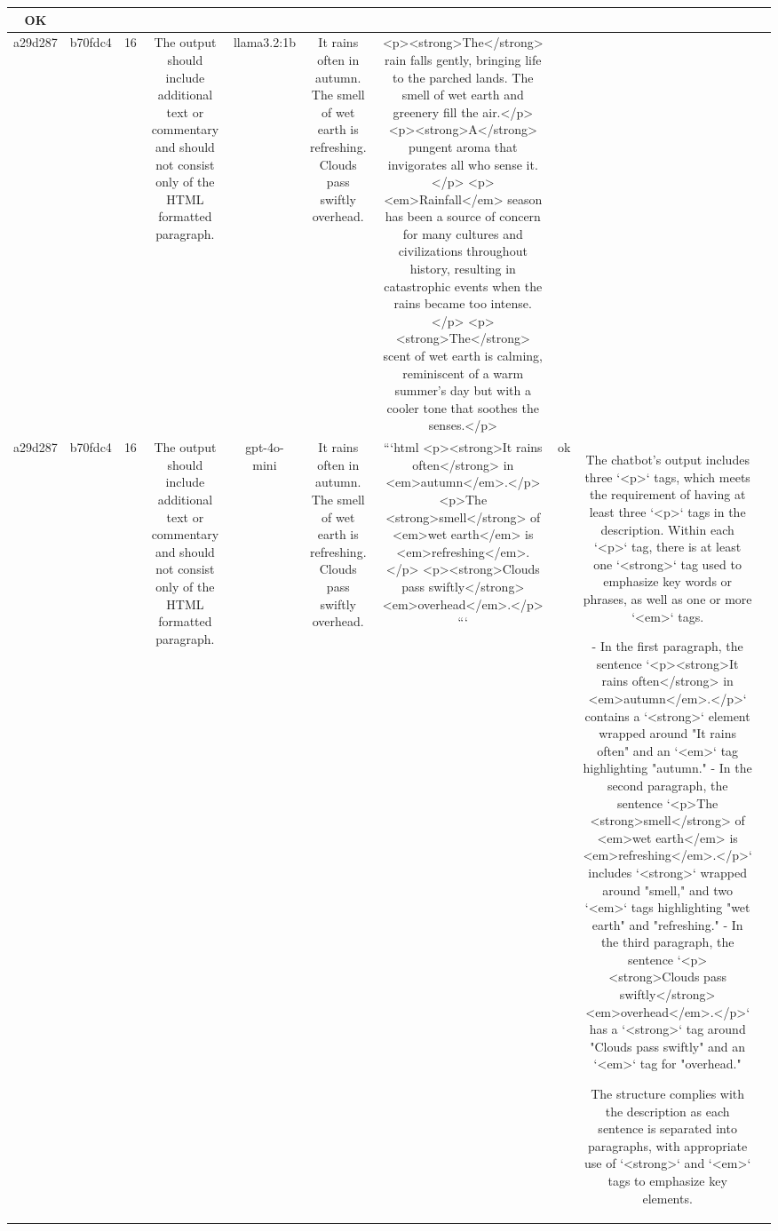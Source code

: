 \begin{table}[h!]
\begin{tabular}{|c|c|c|c|c|c|c|c|c|c|}
OK & \\
\hline
a29d287 & b70fdc4 & 16 & The output should include additional text or commentary and should not consist only of the HTML formatted paragraph. & llama3.2:1b & It rains often in autumn. The smell of wet earth is refreshing. Clouds pass swiftly overhead. & <p><strong>The</strong> rain falls gently, bringing life to the parched lands. The smell of wet earth and greenery fill the air.</p>
<p><strong>A</strong> pungent aroma that invigorates all who sense it.</p>
<p><em>Rainfall</em> season has been a source of concern for many cultures and civilizations throughout history, resulting in catastrophic events when the rains became too intense.</p>
<p><strong>The</strong> scent of wet earth is calming, reminiscent of a warm summer's day but with a cooler tone that soothes the senses.</p> &  &  & \\
\hline
a29d287 & b70fdc4 & 16 & The output should include additional text or commentary and should not consist only of the HTML formatted paragraph. & gpt-4o-mini & It rains often in autumn. The smell of wet earth is refreshing. Clouds pass swiftly overhead. & ```html
<p><strong>It rains often</strong> in <em>autumn</em>.</p>
<p>The <strong>smell</strong> of <em>wet earth</em> is <em>refreshing</em>.</p>
<p><strong>Clouds pass swiftly</strong> <em>overhead</em>.</p>
``` & ok & The chatbot's output includes three `<p>` tags, which meets the requirement of having at least three `<p>` tags in the description. Within each `<p>` tag, there is at least one `<strong>` tag used to emphasize key words or phrases, as well as one or more `<em>` tags. 

- In the first paragraph, the sentence `<p><strong>It rains often</strong> in <em>autumn</em>.</p>` contains a `<strong>` element wrapped around "It rains often" and an `<em>` tag highlighting "autumn."
- In the second paragraph, the sentence `<p>The <strong>smell</strong> of <em>wet earth</em> is <em>refreshing</em>.</p>` includes `<strong>` wrapped around "smell," and two `<em>` tags highlighting "wet earth" and "refreshing."
- In the third paragraph, the sentence `<p><strong>Clouds pass swiftly</strong> <em>overhead</em>.</p>` has a `<strong>` tag around "Clouds pass swiftly" and an `<em>` tag for "overhead."

The structure complies with the description as each sentence is separated into paragraphs, with appropriate use of `<strong>` and `<em>` tags to emphasize key elements.


\end{tabular}
\end{table}
